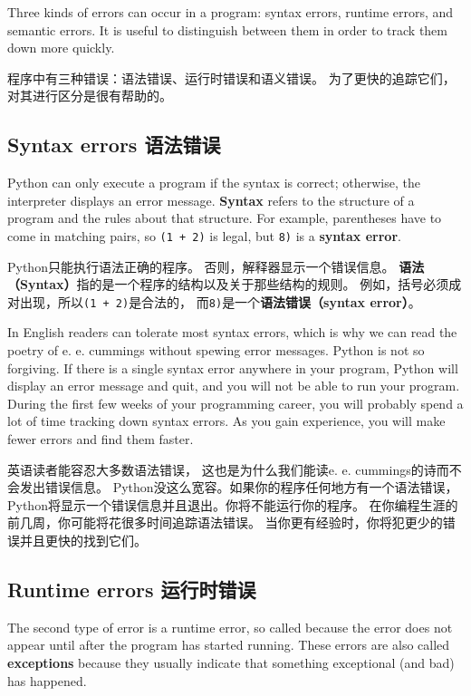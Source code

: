 \documentclass[10pt]{book}
\begin{document}
\begin{CJK}{UTF8}{gbsn}
Three kinds of errors can occur in a program: syntax errors, runtime 
errors, and semantic errors. It is useful
to distinguish between them in order to track them down more quickly.

程序中有三种错误：语法错误、运行时错误和语义错误。
为了更快的追踪它们，对其进行区分是很有帮助的。

\subsection{Syntax errors 语法错误}

Python can only execute a program if the syntax is
correct; otherwise, the interpreter displays an error message.
{\bf Syntax} refers to the structure of a program and the rules about
that structure.  
For example, parentheses have to come in matching pairs, so
{\tt (1 + 2)} is legal, but {\tt 8)} is a {\bf syntax error}.

Python只能执行语法正确的程序。
否则，解释器显示一个错误信息。
{\bf 语法（Syntax）}指的是一个程序的结构以及关于那些结构的规则。
例如，括号必须成对出现，所以{\tt (1 + 2)}是合法的，
而{\tt 8)}是一个{\bf 语法错误（syntax error）}。

In English readers can tolerate most syntax errors, which is why we
can read the poetry of e. e. cummings without spewing error messages.
Python is not so forgiving.  If there is a single syntax error
anywhere in your program, Python will display an error message and quit,
and you will not be able to run your program. During the first few
weeks of your programming career, you will probably spend a lot of
time tracking down syntax errors.  As you gain experience, you will
make fewer errors and find them faster.

英语读者能容忍大多数语法错误，
这也是为什么我们能读e. e. cummings的诗而不会发出错误信息。
Python没这么宽容。如果你的程序任何地方有一个语法错误，
Python将显示一个错误信息并且退出。你将不能运行你的程序。
在你编程生涯的前几周，你可能将花很多时间追踪语法错误。
当你更有经验时，你将犯更少的错误并且更快的找到它们。

\subsection{Runtime errors 运行时错误}
\label{runtime}

The second type of error is a runtime error, so called because the
error does not appear until after the program has started running.
These errors are also called {\bf exceptions} because they usually
indicate that something exceptional (and bad) has happened.


\end{CJK}
\end{document}
